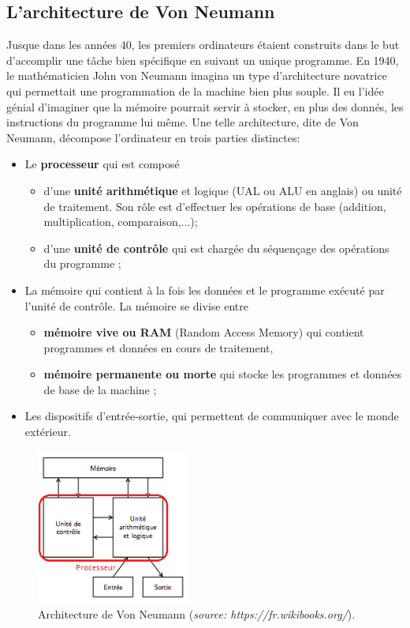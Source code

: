 \subsection{L'architecture de Von Neumann}
Jusque dans les années 40, les premiers ordinateurs étaient construits dans le but d'accomplir une tâche bien spécifique en suivant un unique programme. En 1940, le mathématicien John von Neumann imagina un type d'architecture novatrice qui permettait une programmation de la machine bien plus souple. Il eu l'idée génial d'imaginer que la mémoire pourrait servir à stocker, en plus des donnés, les instructions du programme lui même. Une telle architecture, dite de Von Neumann, décompose l’ordinateur en trois parties distinctes:
\begin{itemize}
	\item Le \textbf{processeur} qui est composé 
	\begin{itemize}
		\item d’une \textbf{unité arithmétique} et logique (UAL ou ALU en anglais) ou unité de traitement. Son rôle est d’effectuer les opérations de base (addition, multiplication, comparaison,...);
		\item  d’une \textbf{unité de contrôle} qui est chargée du séquençage des opérations du programme ;
	\end{itemize}
	\item La mémoire qui contient à la fois les données et le programme exécuté par l’unité de contrôle. La mémoire se divise entre
	 \begin{itemize}
	 	\item \textbf{mémoire vive ou RAM} (Random Access Memory) qui contient programmes et données en cours de traitement, 
	 	\item \textbf{mémoire permanente ou morte} qui stocke les programmes et données de base de la machine ;
	\end{itemize} 	
	\item Les dispositifs d’entrée-sortie, qui permettent de communiquer avec le monde extérieur.
\end{itemize}
\begin{figure}[h!]
	\centering
	\includegraphics[trim=0 0 0 0,width=0.45\textwidth]{Images/ordinateur/arse1_archi_von_neumann_sans_accu.png}
	\caption{Architecture de Von Neumann (\textit{source: https://fr.wikibooks.org/}).}
\end{figure}

